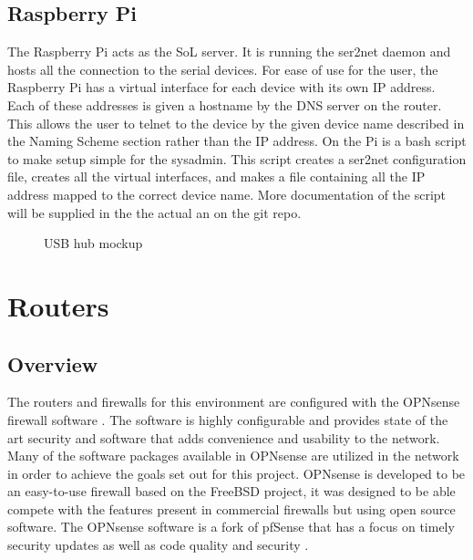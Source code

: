 \documentclass[12pt]{IEEEtran}
\begin{document}
\subsection{Raspberry Pi}
The Raspberry Pi acts as the SoL server.
It is running the ser2net daemon and hosts all the connection to the serial devices.
For ease of use for the user, the Raspberry Pi has a virtual interface for each device with its own IP address.
Each of these addresses is given a hostname by the DNS server on the router.
This allows the user to telnet to the device by the given device name described in the Naming Scheme section rather than the IP address.
On the Pi is a bash script to make setup simple for the sysadmin.
This script creates a ser2net configuration file, creates all the virtual interfaces, and makes a file containing all the IP address mapped to the correct device name.
More documentation of the script will be supplied in the the actual an on the git repo.

\begin{figure}[t]
	\centering
	\caption{USB hub mockup}

\end{figure}

\section{Routers}

\subsection{Overview}
The routers and firewalls for this environment are configured with the OPNsense firewall software \cite{opnsense}.
The software is highly configurable and provides state of the art security and software that adds convenience and usability to the network.
Many of the software packages available in OPNsense are utilized in the network in order to achieve the goals set out for this project.
OPNsense is developed to be an easy-to-use firewall based on the FreeBSD project, it was designed to be able compete with the features present in commercial firewalls but using open source software.
The OPNsense software is a fork of pfSense \cite{pfsense} that has a focus on timely security updates as well as code quality and security \cite{opnsenseabout}. 
\end{document}
